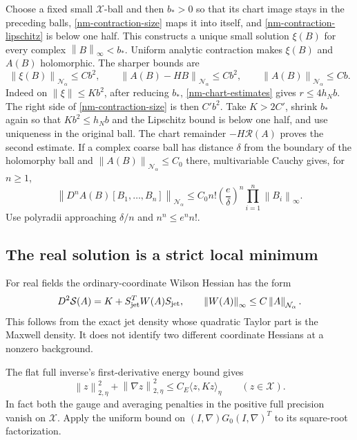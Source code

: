 \documentclass[11pt]{article}
\theoremstyle{remark}\newtheorem{remark}[theorem]{Remark}
\newcommand{\norm}[1]{\left\lVert#1\right\rVert}
\begin{document}
Choose a fixed small $\mathcal X$-ball and then $b_*>0$ so that its
chart image stays in the preceding balls, \eqref{nm-contraction-size}
maps it into itself, and \eqref{nm-contraction-lipschitz} is below
one half. This constructs a unique small solution $\xi(B)$ for
every complex $\norm{B}_\infty<b_*$. Uniform analytic contraction
makes $\xi(B)$ and $A(B)$ holomorphic. The sharper bounds are
\begin{equation}\label{nm-quadratic-remainder}
 \norm{\xi(B)}_{\mathcal N_\alpha}\le Cb^2,
 \qquad \norm{A(B)-HB}_{\mathcal N_\alpha}\le Cb^2,
 \qquad \norm{A(B)}_{\mathcal N_\alpha}\le Cb.
\end{equation}
Indeed on $\norm{\xi}\le Kb^2$, after reducing $b_*$,
\eqref{nm-chart-estimates} gives $r\le4h_Nb$. The right side of
\eqref{nm-contraction-size} is then $C'b^2$. Take $K>2C'$, shrink
$b_*$ again so that $Kb^2\le h_Nb$ and the Lipschitz bound is below
one half, and use uniqueness in the original ball. The chart
remainder $-H\mathcal R(A)$ proves the second estimate.
If a complex coarse ball has distance $\delta$ from the boundary
of the holomorphy ball and $\norm{A(B)}_{\mathcal N_\alpha}\le C_0$
there, multivariable Cauchy gives, for $n\ge1$,
\begin{equation}\label{nm-cauchy}
 \norm{D^nA(B)[B_1,\ldots,B_n]}_{\mathcal N_\alpha}
 \le C_0 n!\left(\frac e\delta\right)^n
                    \prod_{i=1}^n\norm{B_i}_\infty.
\end{equation}
Use polyradii approaching $\delta/n$ and $n^n\le e^n n!$.

\subsection{The real solution is a strict local minimum}
\label{nm-minimum}

For real fields the ordinary-coordinate Wilson Hessian has the
form
\begin{equation}\label{nm-action-hessian}
 D^2\mathcal S(A)=K+S_{\rm jet}^TW(A)S_{\rm jet},
 \qquad \norm{W(A)}_\infty\le C\norm{A}_{\mathcal N_\alpha}.
\end{equation}
This follows from the exact jet density whose quadratic Taylor
part is the Maxwell density. It does not identify two different
coordinate Hessians at a nonzero background.

The flat full inverse's first-derivative energy bound gives
\begin{equation}\label{nm-coercivity}
 \norm{z}_{2,\eta}^2+\norm{\nabla z}_{2,\eta}^2
 \le C_E\langle z,Kz\rangle_\eta\qquad(z\in\mathcal X).
\end{equation}
In fact both the gauge and averaging penalties in the positive
full precision vanish on $\mathcal X$. Apply the uniform bound on
$(I,\nabla)G_0(I,\nabla)^T$ to its square-root factorization.
\end{document}
